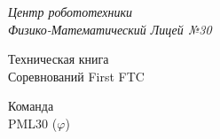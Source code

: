 	
\thispagestyle{titlestyle}
\begin{titlepage}
	\newpage
	
	\begin{center}
		\LARGE\textit{Центр робототехники \\ Физико-Математический Лицей №30}
		
		\vspace{8em}
		
		\LARGE{Техническая книга \\ Соревнований First FTC}
		
		\vspace{4em}
		
		Команда \\ PML30 (${\varphi}$)
		
	\end{center}
\end{titlepage}

\newpage
